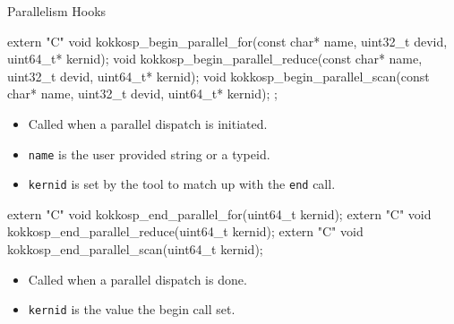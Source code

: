 \begin{frame}[fragile]{Parallelism Hooks}
\begin{code}[keywords={extern,void,int,uint64_t,uint32_t,const,char}]
extern "C" {
  void kokkosp_begin_parallel_for(const char* name,
                                  uint32_t devid,
                                  uint64_t* kernid);
  void kokkosp_begin_parallel_reduce(const char* name,
                                     uint32_t devid,
                                     uint64_t* kernid);
  void kokkosp_begin_parallel_scan(const char* name,
                                   uint32_t devid,
                                   uint64_t* kernid);
};
\end{code}
\vspace{-15pt}
\begin{itemize}
  \item Called when a parallel dispatch is initiated.
  \item \texttt{name} is the user provided string or a typeid.
  \item \texttt{kernid} is set by the tool to match up with the \texttt{end} call.
\end{itemize}

\begin{code}[keywords={extern,void,int,uint64_t,uint32_t,const,char}]
extern "C" void kokkosp_end_parallel_for(uint64_t kernid);
extern "C" void kokkosp_end_parallel_reduce(uint64_t kernid);
extern "C" void kokkosp_end_parallel_scan(uint64_t kernid);
\end{code}
\vspace{-15pt}
\begin{itemize}
  \item Called when a parallel dispatch is done.
  \item \texttt{kernid} is the value the begin call set.
\end{itemize}
\end{frame}


